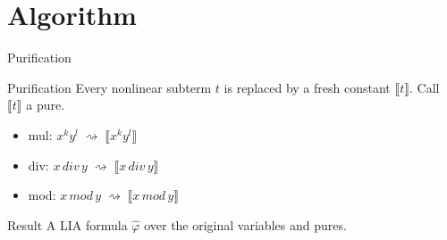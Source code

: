 \documentclass[11pt]{beamer}
\newcommand{\pure}[1]{\llbracket{#1}\rrbracket}
\newcommand{\divc}[2]{#1\,\mathit{div}\,#2}
\newcommand{\modc}[2]{#1\,\mathit{mod}\,#2}
\begin{document}
\section{Algorithm}

\begin{frame}{Purification}
	\begin{block}{Purification}
		Every nonlinear subterm $t$ is replaced by a fresh constant $\pure{t}$.
		Call $\pure{t}$ a \alert{pure}.
	\end{block}
	\begin{itemize}
		\item mul: \quad $x^ky^l \;\rightsquigarrow\; \pure{x^ky^l}$
		\item div: \quad $\divc{x}{y} \;\rightsquigarrow\; \pure{\divc{x}{y}}$
		\item mod: \quad $\modc{x}{y} \;\rightsquigarrow\; \pure{\modc{x}{y}}$
	\end{itemize}
	\begin{block}{Result}
		A LIA formula $\widehat\varphi$ over the original variables and pures.
	\end{block}
\end{frame}
\end{document}
